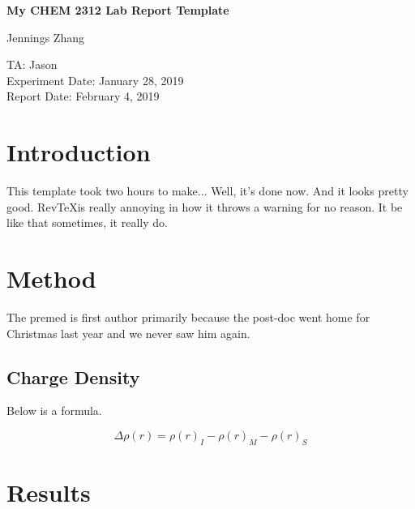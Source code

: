 \documentclass[letterpaper,amsmath,amssymb,prb,preprint,12pt]{revtex4-1}%
\begin{document}
\setcounter{page}{0}
\raggedbottom

\begin{titlepage}
\begin{center}

\vspace*{6cm}
\Large
\textbf{My CHEM 2312 Lab Report Template}

\vspace{0.5cm}
\large
Jennings Zhang
\vspace{1.5cm}

TA: Jason\\
Experiment Date: January 28, 2019\\
Report Date: February 4, 2019

\end{center}
\thispagestyle{empty} %
\end{titlepage}


\section{Introduction}

This template took two hours to make... Well, it's done now. And it looks pretty good. Rev\TeX is really annoying in how it throws a warning for no reason. It be like that sometimes, it really do.


\section{Method}

The premed is first author primarily because the post-doc went home for Christmas last year and we never saw him again.

\subsection{Charge Density}

Below is a formula.

\[\Delta\rho(r)=\rho(r)_{I}-\rho(r)_{M}-\rho(r)_{S}\]

\section{Results}
\end{document}

